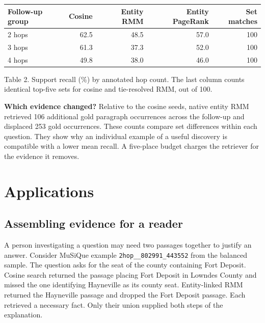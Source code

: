 \documentclass[11pt,a4paper]{article}
\begin{document}
\begin{center}
\begin{tabular}{@{}lrrrr@{}}
\toprule
Follow-up group & Cosine & Entity RMM & Entity PageRank & Set matches\\
\midrule
2 hops & 62.5 & 48.5 & 57.0 & 100 \\
3 hops & 61.3 & 37.3 & 52.0 & 100 \\
4 hops & 49.8 & 38.0 & 46.0 & 100 \\
\bottomrule
\end{tabular}
\par{\small Table 2. Support recall (\%) by annotated hop count. The last column counts identical top-five sets for cosine and tie-resolved RMM, out of 100.}
\end{center}

\textbf{Which evidence changed?} Relative to the cosine seeds, native entity RMM retrieved 106 additional gold paragraph occurrences across the follow-up and displaced 253 gold occurrences. These counts compare set differences within each question. They show why an individual example of a useful discovery is compatible with a lower mean recall. A five-place budget charges the retriever for the evidence it removes.

\newpage
\section{Applications}\label{sec:applications}
\subsection*{Assembling evidence for a reader}
A person investigating a question may need two passages together to justify an answer. Consider MuSiQue example \texttt{2hop\_\_802991\_443552} from the balanced sample. The question asks for the seat of the county containing Fort Deposit. Cosine search returned the passage placing Fort Deposit in Lowndes County and missed the one identifying Hayneville as its county seat. Entity-linked RMM returned the Hayneville passage and dropped the Fort Deposit passage. Each retrieved a necessary fact. Only their union supplied both steps of the explanation.
\end{document}
